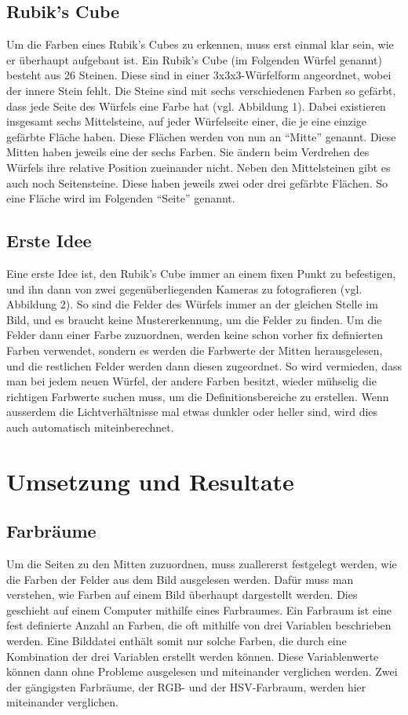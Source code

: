 \documentclass[a4paper, 12pt]{article}
\begin{document}
\subsection{Rubik's Cube}
Um die Farben eines Rubik's Cubes zu erkennen, muss erst einmal klar sein, wie er überhaupt aufgebaut ist. Ein Rubik's Cube (im Folgenden Würfel genannt) besteht aus 26 Steinen. Diese sind in einer 3x3x3-Würfelform angeordnet, wobei der innere Stein fehlt. Die Steine sind mit sechs verschiedenen Farben so gefärbt, dass jede Seite des Würfels eine Farbe hat (vgl. Abbildung 1).
\newline
Dabei existieren insgesamt sechs Mittelsteine, auf jeder Würfelseite einer, die je eine einzige gefärbte Fläche haben. Diese Flächen werden von nun an "`Mitte"' genannt. Diese Mitten haben jeweils eine der sechs Farben. Sie ändern beim Verdrehen des Würfels ihre relative Position zueinander nicht.
\newline
Neben den Mittelsteinen gibt es auch noch Seitensteine. Diese haben jeweils zwei oder drei gefärbte Flächen. So eine Fläche wird im Folgenden "`Seite"' genannt.
\subsection{Erste Idee}
Eine erste Idee ist, den Rubik's Cube immer an einem fixen Punkt zu befestigen, und ihn dann von zwei gegenüberliegenden Kameras zu fotografieren (vgl. Abbildung 2). So sind die Felder des Würfels immer an der gleichen Stelle im Bild, und es braucht keine Mustererkennung, um die Felder zu finden.
\newline
Um die Felder dann einer Farbe zuzuordnen, werden keine schon vorher fix definierten Farben verwendet, sondern es werden die Farbwerte der Mitten herausgelesen, und die restlichen Felder werden dann diesen zugeordnet. So wird vermieden, dass man bei jedem neuen Würfel, der andere Farben besitzt, wieder mühselig die richtigen Farbwerte suchen muss, um die Definitionsbereiche zu erstellen. Wenn ausserdem die Lichtverhältnisse  mal etwas dunkler oder heller sind, wird dies auch automatisch miteinberechnet. 
\newpage
\section{Umsetzung und Resultate}
\subsection{Farbräume}
Um die Seiten zu den Mitten zuzuordnen, muss zuallererst festgelegt werden, wie die Farben der Felder aus dem Bild ausgelesen werden. Dafür muss man verstehen, wie Farben auf einem Bild überhaupt dargestellt werden. Dies geschieht auf einem Computer mithilfe eines Farbraumes. Ein Farbraum ist eine fest definierte Anzahl an Farben, die oft mithilfe von drei Variablen beschrieben werden. Eine Bilddatei enthält somit nur solche Farben, die durch eine Kombination der drei Variablen erstellt werden können. \cite{Farbraum} Diese Variablenwerte können dann ohne Probleme ausgelesen und miteinander verglichen werden. Zwei der gängigsten Farbräume, der RGB- und der HSV-Farbraum, werden hier miteinander verglichen. 
\end{document}
